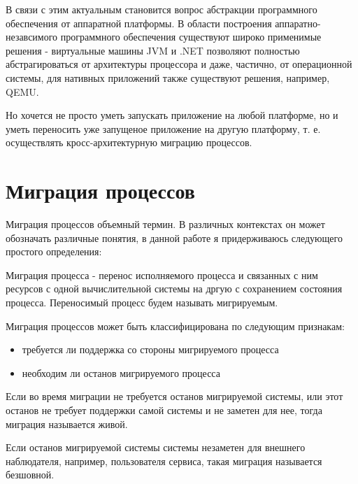 В связи с этим актуальным становится вопрос абстракции программного обеспечения от аппаратной платформы. В области построения аппаратно-незавсимого программного обеспечения существуют широко применимые решения - виртуальные машины JVM и .NET позволяют полностью абстрагироваться от архитектуры процессора и даже, частично, от операционной системы, для нативных приложений также существуют решения, например, QEMU.

Но хочется не просто уметь запускать приложение на любой платформе, но и уметь переносить уже запущеное приложение на другую платформу, т. е. осуществлять кросс-архитектурную миграцию процессов.

\section{Миграция процессов}

Миграция процессов объемный термин. В различных контекстах он может обозначать различные понятия, в данной работе я придерживаюсь следующего простого определения:

\begin{Def}\label{migration}
Миграция процесса - перенос исполняемого процесса и связанных с ним ресурсов с одной вычислительной системы на дргую с сохранением состояния процесса. Переносимый процесс будем называть мигрируемым.
\end{Def}

Миграция процессов может быть классифицирована по следующим признакам:

\begin{itemize}

    \item требуется ли поддержка со стороны мигрируемого процесса
    \item необходим ли останов мигрируемого процесса

\end{itemize}

\begin{Def}\label{live_migration}
Если во время миграции не требуется останов мигрируемой системы, или этот останов не требует поддержки самой системы и не заметен для нее, тогда миграция называется живой.
\end{Def}

\begin{Def}\label{seamless_live_migration}
Если останов мигрируемой системы системы незаметен для внешнего наблюдателя, например, пользователя сервиса, такая миграция называется безшовной.
\end{Def}

